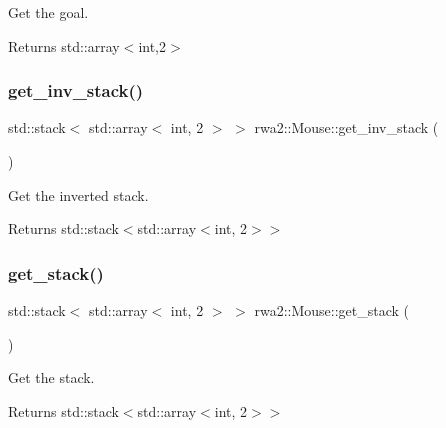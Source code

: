 Get the goal. 

\begin{DoxyReturn}{Returns}
std\+::array$<$int,2$>$ 
\end{DoxyReturn}
\mbox{\label{classrwa2_1_1_mouse_aa6d86495a913a892ae279016d9e1181d}} 
\subsubsection{\texorpdfstring{get\+\_\+inv\+\_\+stack()}{get\_inv\_stack()}}
{\footnotesize\ttfamily std\+::stack$<$ std\+::array$<$ int, 2 $>$ $>$ rwa2\+::\+Mouse\+::get\+\_\+inv\+\_\+stack (\begin{DoxyParamCaption}{ }\end{DoxyParamCaption})}



Get the inverted stack. 

\begin{DoxyReturn}{Returns}
std\+::stack$<$std\+::array$<$int, 2$>$$>$ 
\end{DoxyReturn}
\mbox{\label{classrwa2_1_1_mouse_a809c9a41608037e6af0910765fe6fa06}} 
\subsubsection{\texorpdfstring{get\+\_\+stack()}{get\_stack()}}
{\footnotesize\ttfamily std\+::stack$<$ std\+::array$<$ int, 2 $>$ $>$ rwa2\+::\+Mouse\+::get\+\_\+stack (\begin{DoxyParamCaption}{ }\end{DoxyParamCaption})}



Get the stack. 

\begin{DoxyReturn}{Returns}
std\+::stack$<$std\+::array$<$int, 2$>$$>$ 
\end{DoxyReturn}
\mbox{\label{classrwa2_1_1_mouse_a789be287a432bafc903c97396a014d7d}} 
